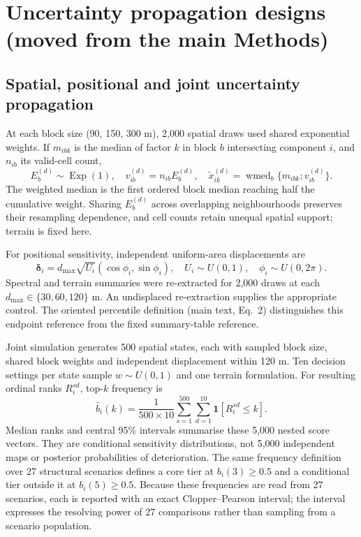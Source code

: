 \documentclass[10pt,a4paper]{article}
\begin{document}
\section{Uncertainty propagation designs (moved from the main Methods)}
\subsection{Spatial, positional and joint uncertainty propagation}
At each block size (90, 150, 300 m), 2,000 spatial draws used shared exponential weights. If $m_{ibk}$ is the median of factor $k$ in block $b$ intersecting component $i$, and $n_{ib}$ its valid-cell count,
\begin{equation}\label{eq:block}
E_b^{(d)}\sim\operatorname{Exp}(1),\quad v_{ib}^{(d)}=n_{ib}E_b^{(d)},\quad
\widetilde x_{ik}^{(d)}=\operatorname{wmed}_{b}\{m_{ibk};v_{ib}^{(d)}\}.
\end{equation}
The weighted median is the first ordered block median reaching half the cumulative weight. Sharing $E_b^{(d)}$ across overlapping neighbourhoods preserves their resampling dependence, and cell counts retain unequal spatial support; terrain is fixed here.

For positional sensitivity, independent uniform-area displacements are
\begin{equation}\label{eq:displacement}
\boldsymbol\delta_i=d_{\max}\sqrt{U_i}(\cos\phi_i,\sin\phi_i),\quad
U_i\sim U(0,1),\quad \phi_i\sim U(0,2\pi).
\end{equation}
Spectral and terrain summaries were re-extracted for 2,000 draws at each $d_{\max}\in\{30,60,120\}$ m. An undisplaced re-extraction supplies the appropriate control. The oriented percentile definition (main text, Eq.~2) distinguishes this endpoint reference from the fixed summary-table reference.

Joint simulation generates 500 spatial states, each with sampled block size, shared block weights and independent displacement within 120 m. Ten decision settings per state sample $w\sim U(0,1)$ and one terrain formulation. For resulting ordinal ranks $R_i^{sd}$, top-$k$ frequency is
\begin{equation}\label{eq:acceptability}
\widehat b_i(k)=\frac{1}{500\times10}\sum_{s=1}^{500}\sum_{d=1}^{10}
 \mathbf1[R_i^{sd}\leq k].
\end{equation}
Median ranks and central 95\% intervals summarise these 5,000 nested score vectors. They are conditional sensitivity distributions, not 5,000 independent maps or posterior probabilities of deterioration. The same frequency definition over 27 structural scenarios defines a core tier at
$b_i(3)\geq0.5$ and a conditional tier outside it at $b_i(5)\geq0.5$. Because
these frequencies are read from 27 scenarios, each is reported with an exact
Clopper--Pearson interval; the interval expresses the resolving power of 27
comparisons rather than sampling from a scenario population.
\end{document}
